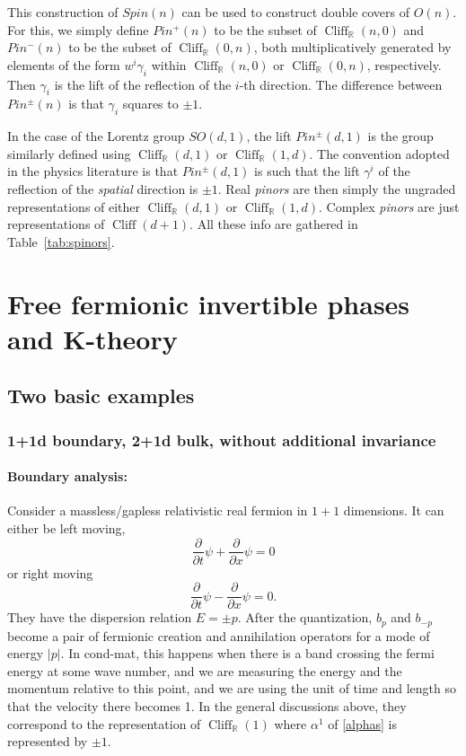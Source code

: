 \documentclass[12pt]{article}
\numberwithin{equation}{section}
\numberwithin{figure}{section}
\theoremstyle{remark}
\def\bR{\mathbb{R}}
\def\Cliff{\mathop{\mathrm{Cliff}}\nolimits}
\begin{document}
This construction of $Spin(n)$ can be used to construct double covers of $O(n)$.
For this, we simply define $Pin^+(n)$ to be the subset of $\Cliff_\bR(n,0)$
and $Pin^-(n)$ to be the subset of $\Cliff_\bR(0,n)$,
both multiplicatively generated by elements of the form $w^i \gamma_i$ 
within $\Cliff_\bR(n,0)$ or $\Cliff_\bR(0,n)$, respectively. 
Then $\gamma_i$  is the lift of the reflection of the $i$-th direction.
The difference between $Pin^\pm(n)$ is that $\gamma_i$ squares to $\pm1$.

In the case of the Lorentz group $SO(d,1)$, the lift $Pin^\pm(d,1)$ is
the group similarly defined using $\Cliff_\bR(d,1)$ or $\Cliff_\bR(1,d)$.
The convention adopted in the physics literature is that
$Pin^\pm(d,1)$ is such that the lift $\gamma^i$ 
of the reflection of the \emph{spatial} direction is $\pm1$.
Real \emph{pinors} are then simply the ungraded representations of either $\Cliff_\bR(d,1)$ or $\Cliff_\bR(1,d)$.
Complex \emph{pinors} are just representations of $\Cliff(d+1)$.
All these info are gathered in Table~\ref{tab:spinors}.

\goodbreak

\section{Free fermionic invertible phases and K-theory}

\subsection{Two basic examples}

\subsubsection{1+1d boundary, 2+1d bulk, without additional invariance}
\paragraph{Boundary analysis:}
Consider a massless/gapless relativistic real fermion in $1+1$ dimensions. 
It can either be left moving, \begin{equation}
\frac{\partial}{\partial t} \psi + \frac{\partial} {\partial x}\psi =0
\end{equation} or right moving \begin{equation}
\frac{\partial}{\partial t} \psi - \frac{\partial} {\partial x}\psi =0.
\end{equation} They have the dispersion relation $E=\pm p$.
After the quantization, $b_p$ and $b_{-p}$ become 
a pair of fermionic creation and annihilation operators for a mode of energy $|p|$.
In cond-mat, this happens when there is a band crossing the fermi energy at some wave number,
and we are measuring the energy and the momentum relative to this point,
and we are using the unit of time and length so that the velocity there becomes 1.
In the general discussions above, they correspond to the representation of $\Cliff_\bR(1)$
where $\alpha^1$ of \eqref{alphas} is represented by $\pm1$.
\end{document}
